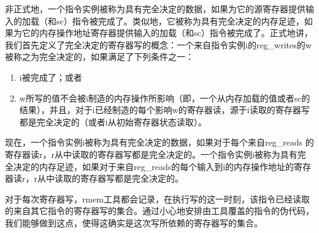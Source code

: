 非正式地，一个指令实例被称为具有完全决定的数据，如果为它的源寄存器提供输入的加载（和sc）指令被完成了。类似地，它被称为具有完全决定的内存足迹，如果为它的内存操作地址寄存器提供输入的加载（和sc）指令被完成了。正式地讲，我们首先定义了完全决定的寄存器写的概念：一个来自指令实例i的reg_writes的w被称之为完全决定的，如果满足了下列条件之一：
%
\begin{enumerate}
\item i被完成了；或者 %
\item w所写的值不会被i制造的内存操作所影响（即，一个从内存加载的值或者sc的结果），并且，对于i已经制造的每个影响w的寄存器读，源于i读取的寄存器写都是完全决定的（或者i从初始寄存器状态读取）。 
\end{enumerate}
现在，一个指令实例i被称为具有完全决定的数据，如果对于每个来自reg_reads 的寄存器读r，r从中读取的寄存器写都是完全决定的。一个指令实例i被称为具有完全决定的内存足迹，如果对于来自reg_reads的每个输入到i的内存操作地址的寄存器读r，r从中读取的寄存器写都是完全决定的。
\begin{commentary}
  对于每次寄存器写，rmem工具都会记录，在执行写的这一时刻，该指令已经读取的来自其它指令的寄存器写的集合。通过小心地安排由工具覆盖的指令的伪代码，我们能够做到这点，使得这确实是这次写所依赖的寄存器写的集合。
\end{commentary}


